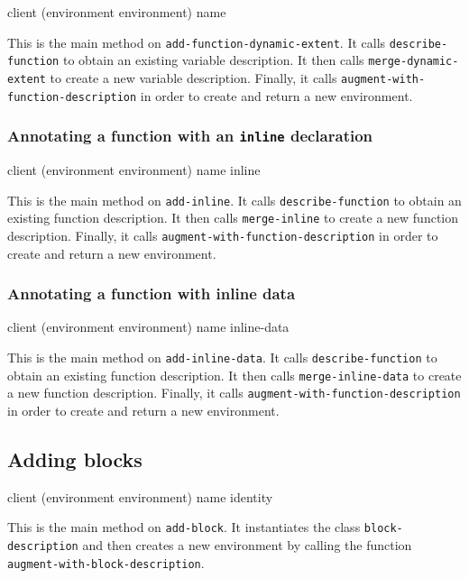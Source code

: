 {\footnotesize
{}
{client
 (environment environment)
 name}
}

This is the main method on \texttt{add-function-dynamic-extent}.  It
calls \texttt{describe-function} to obtain an existing variable
description.  It then calls \texttt{merge-dynamic-extent} to create a new
variable description.  Finally, it calls
\texttt{augment-with-function-description} in order to create and
return a new environment.

\subsubsection{Annotating a function with an \texttt{inline} declaration}

{\footnotesize
{}
{client
 (environment environment)
 name
 inline}
}

This is the main method on \texttt{add-inline}.  It calls
\texttt{describe-function} to obtain an existing function description.
It then calls \texttt{merge-inline} to create a new function
description.  Finally, it calls
\texttt{augment-with-function-description} in order to create and
return a new environment.

\subsubsection{Annotating a function with inline data}

{\footnotesize
{}
{client
 (environment environment)
 name
 inline-data}
}

This is the main method on \texttt{add-inline-data}.  It calls
\texttt{describe-function} to obtain an existing function description.
It then calls \texttt{merge-inline-data} to create a new function
description.  Finally, it calls
\texttt{augment-with-function-description} in order to create and
return a new environment.

\subsection{Adding blocks}

{\footnotesize
{}
{client
 (environment environment)
 name
 \optional identity}
}

This is the main method on \texttt{add-block}.  It instantiates the
class \texttt{block-description} and then creates a new
environment by calling the function
\texttt{augment-with-block-description}.


